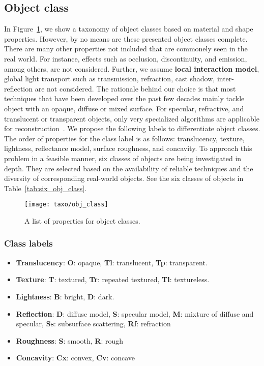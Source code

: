 \subsection{Object class}
In Figure~\ref{fig:obj_class}, we show a taxonomy of object classes based on material and shape properties. However, by no means are these presented object classes complete. There are many other properties not included that are commonely seen in the real world. For instance, effects such as occlusion, discontinuity, and emission, among others, are not considered. Further, we assume \textbf{local interaction model}, \ie global light transport such as transmission, refraction, cast shadow, inter-reflection are not considered. The rationale behind our choice is that most techniques that have been developed over the past few decades mainly tackle object with an opaque, diffuse or mixed surface. For specular, refractive, and translucent or transparent objects, only very specialized algorithms are applicable for reconstruction~\cite{ihrke2010transparent}. We propose the following labels to differentiate object classes. The order of properties for the class label is as follows: translucency, texture, lightness, reflectance model, surface roughness, and concavity. To approach this problem in a feasible manner, six classes of objects are being investigated in depth. They are selected based on the availability of reliable techniques and the diversity of corresponding real-world objects. See the six classes of objects in Table~\ref{tab:six_obj_class}.
\begin{figure}[!htbp]
\centering
\texttt{[image: taxo/obj\_class]}\\
\caption{A list of properties for object classes.}
\label{fig:obj_class}
\end{figure}

\subsubsection{Class labels}
\begin{itemize}
\item \textbf{Translucency}: \textbf{O}: opaque, \textbf{Tl}: translucent, \textbf{Tp}: transparent.
\item \textbf{Texture}: \textbf{T}: textured, \textbf{Tr}: repeated textured, \textbf{Tl}: textureless.
\item \textbf{Lightness}: \textbf{B}: bright, \textbf{D}: dark.
\item \textbf{Reflection}: \textbf{D}: diffuse model, \textbf{S}: specular model, \textbf{M}: mixture of diffuse and specular, \textbf{Ss}: subsurface scattering, \textbf{Rf}: refraction
\item \textbf{Roughness}: \textbf{S}: smooth, \textbf{R}: rough
\item \textbf{Concavity}: \textbf{Cx}: convex, \textbf{Cv}: concave
\end{itemize}

